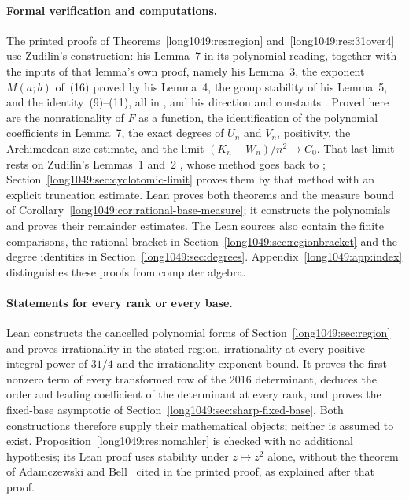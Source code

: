 \paragraph{Formal verification and computations.}
The printed proofs of Theorems~\ref{long1049:res:region}
and~\ref{long1049:res:31over4} use Zudilin's construction: his Lemma~7 in its polynomial reading, together with the
inputs of that lemma's own proof, namely his Lemma~3, the exponent $M(a;b)$
of~(16) proved by his Lemma~4, the group stability of his Lemma~5, and the
identity~(9)--(11), all in \cite[pp.~156--161]{zudilin2004}, and his direction and
constants \cite[p.~162]{zudilin2004}.  Proved here are
the nonrationality of $F$ as a function, the identification of the
polynomial coefficients in Lemma~7, the exact degrees of $U_n$ and $V_n$,
positivity, the Archimedean size estimate, and the limit
$(K_n-W_n)/n^{2}\to C_0$.  That last limit rests on Zudilin's Lemmas~1 and~2
\cite[p.~155]{zudilin2004}, whose method goes back to
\cite[Lemma~1, p.~466]{zudilin2002}; Section~\ref{long1049:sec:cyclotomic-limit}
proves them by that method with an explicit truncation estimate.  Lean
proves both theorems and the measure bound of
Corollary~\ref{long1049:cor:rational-base-measure}; it constructs the
polynomials and proves their remainder estimates.  The Lean sources also
contain the finite comparisons, the rational bracket in
Section~\ref{long1049:sec:regionbracket} and the degree identities in
Section~\ref{long1049:sec:degrees}. Appendix~\ref{long1049:app:index}
distinguishes these proofs from computer algebra.

\paragraph{Statements for every rank or every base.}
Lean constructs the cancelled polynomial forms of
Section~\ref{long1049:sec:region} and proves irrationality in the
stated region, irrationality at every positive integral power of $31/4$
and the irrationality-exponent bound. It proves the first nonzero term
of every transformed row of the 2016 determinant, deduces the order and
leading coefficient of the determinant at every rank, and proves the
fixed-base asymptotic of Section~\ref{long1049:sec:sharp-fixed-base}.
Both constructions therefore supply their mathematical objects; neither
is assumed to exist. Proposition~\ref{long1049:res:nomahler} is checked
with no additional hypothesis; its Lean proof uses stability under
$z\mapsto z^2$ alone, without the theorem of Adamczewski and
Bell~\cite[Thm.~1.1, p.~6]{adamczewskibell2013} cited in the printed
proof, as explained after that proof.


